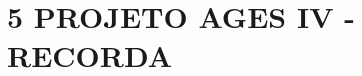 \hypertarget{__RefHeading___Toc4827_3118176633}{}
\hypertarget{_Toc45627149}{}
\chapter*{5 PROJETO AGES IV - RECORDA\originalspace{}}
\label{ages-iv:text-h-0105}
